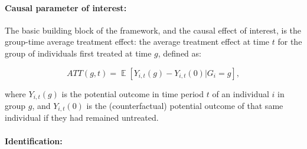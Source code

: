 \paragraph{Causal parameter of interest:}%
\label{par:causal_parameter_of_interest_}

The basic building block of the framework, and the causal effect of interest,
is the group-time average treatment effect: the average treatment effect at
time $t$ for the group of individuals first treated at time $g$, defined as:

\begin{equation}
    ATT(g,t) = \mathop{\mathbb{E}}[Y_{i,t}(g) - Y_{i,t}(0)|G_i =
    g],
\end{equation}

\noindent where $Y_{i,t}(g)$ is the potential outcome in time period $t$ of an individual
$i$ in group $g$, and $Y_{i,t}(0)$ is the (counterfactual) potential outcome of that same
individual if they had remained untreated.


\paragraph{Identification:}%
\label{par:identification_}

